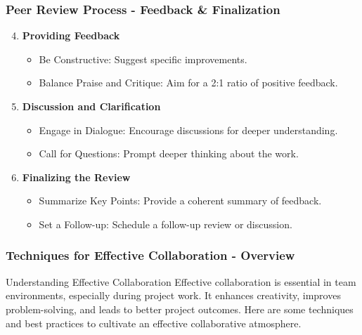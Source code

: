 \documentclass{beamer}
\begin{document}
\begin{frame}[fragile]
    \frametitle{Peer Review Process - Feedback & Finalization}
    \begin{enumerate}
        \setcounter{enumi}{3} %
        \item \textbf{Providing Feedback}
            \begin{itemize}
                \item Be Constructive: Suggest specific improvements.
                \item Balance Praise and Critique: Aim for a 2:1 ratio of positive feedback.
            \end{itemize}
        \item \textbf{Discussion and Clarification}
            \begin{itemize}
                \item Engage in Dialogue: Encourage discussions for deeper understanding.
                \item Call for Questions: Prompt deeper thinking about the work.
            \end{itemize}
        \item \textbf{Finalizing the Review}
            \begin{itemize}
                \item Summarize Key Points: Provide a coherent summary of feedback.
                \item Set a Follow-up: Schedule a follow-up review or discussion.
            \end{itemize}
    \end{enumerate}
\end{frame}

\begin{frame}[fragile]
    \frametitle{Techniques for Effective Collaboration - Overview}
    \begin{block}{Understanding Effective Collaboration}
        Effective collaboration is essential in team environments, especially during project work. 
        It enhances creativity, improves problem-solving, and leads to better project outcomes. 
        Here are some techniques and best practices to cultivate an effective collaborative atmosphere.
    \end{block}
\end{frame}
\end{document}
